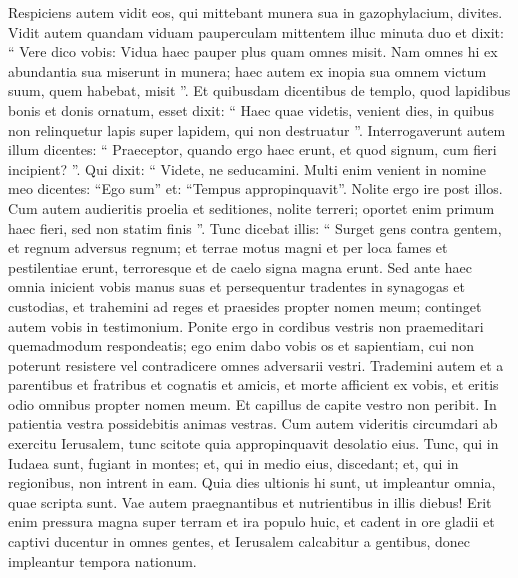 \begin{biblechapter}
\begin{biblechapter}
\begin{biblechapter}
\begin{biblechapter}
\begin{biblechapter}
\begin{biblechapter}
\begin{biblechapter}
\begin{biblechapter}
\begin{biblechapter}
\begin{biblechapter}
\begin{biblechapter}
\begin{biblechapter}
\begin{biblechapter}
\begin{biblechapter}
\begin{biblechapter}
\begin{biblechapter}
\begin{biblechapter}
\begin{biblechapter}
\begin{biblechapter}
\begin{biblechapter}
\begin{biblechapter}
\verse Respiciens autem vidit eos, qui mittebant munera sua in gazophylacium, divites. 
\verse Vidit autem quandam viduam pauperculam mittentem illuc minuta duo 
 \verse et dixit: “ Vere dico vobis: Vidua haec pauper plus quam omnes misit. 
\verse Nam omnes hi ex abundantia sua miserunt in munera; haec autem ex inopia sua omnem victum suum, quem habebat, misit ”.
 \verse Et quibusdam dicentibus de templo, quod lapidibus bonis et donis ornatum, esset dixit: 
\verse “ Haec quae videtis, venient dies, in quibus non relinquetur lapis super lapidem, qui non destruatur ”. 
\verse Interrogaverunt autem illum dicentes: “ Praeceptor, quando ergo haec erunt, et quod signum, cum fieri incipient? ”. 
\verse Qui dixit: “ Videte, ne seducamini. Multi enim venient in nomine meo dicentes: “Ego sum” et: “Tempus appropinquavit”. Nolite ergo ire post illos. 
\verse Cum autem audieritis proelia et seditiones, nolite terreri; oportet enim primum haec fieri, sed non statim finis ”.
 \verse Tunc dicebat illis: “ Surget gens contra gentem, et regnum adversus regnum; 
\verse et terrae motus magni et per loca fames et pestilentiae erunt, terroresque et de caelo signa magna erunt. 
\verse Sed ante haec omnia inicient vobis manus suas et persequentur tradentes in synagogas et custodias, et trahemini ad reges et praesides propter nomen meum; 
\verse continget autem vobis in testimonium. 
\verse Ponite ergo in cordibus vestris non praemeditari quemadmodum respondeatis; 
\verse ego enim dabo vobis os et sapientiam, cui non poterunt resistere vel contradicere omnes adversarii vestri. 
\verse Trademini autem et a parentibus et fratribus et cognatis et amicis, et morte afficient ex vobis, 
\verse et eritis odio omnibus propter nomen meum. 
\verse Et capillus de capite vestro non peribit. 
\verse In patientia vestra possidebitis animas vestras.
 \verse Cum autem videritis circumdari ab exercitu Ierusalem, tunc scitote quia appropinquavit desolatio eius. 
\verse Tunc, qui in Iudaea sunt, fugiant in montes; et, qui in medio eius, discedant; et, qui in regionibus, non intrent in eam. 
\verse Quia dies ultionis hi sunt, ut impleantur omnia, quae scripta sunt. 
 \verse Vae autem praegnantibus et nutrientibus in illis diebus! Erit enim pressura magna super terram et ira populo huic, 
\verse et cadent in ore gladii et captivi ducentur in omnes gentes, et Ierusalem calcabitur a gentibus, donec impleantur tempora nationum.

\end{biblechapter}
\end{biblechapter}
\end{biblechapter}
\end{biblechapter}
\end{biblechapter}
\end{biblechapter}
\end{biblechapter}
\end{biblechapter}
\end{biblechapter}
\end{biblechapter}
\end{biblechapter}
\end{biblechapter}
\end{biblechapter}
\end{biblechapter}
\end{biblechapter}
\end{biblechapter}
\end{biblechapter}
\end{biblechapter}
\end{biblechapter}
\end{biblechapter}
\end{biblechapter}
